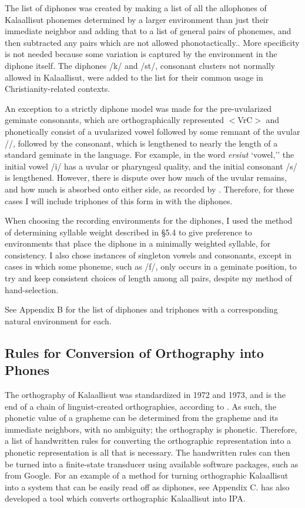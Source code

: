 \documentclass[12pt]{article}
\begin{document}
	The list of diphones was created by making a list of all the allophones of Kalaallisut phonemes determined by a larger environment than just their immediate neighbor and adding that to a list of general pairs of phonemes, and then subtracted any pairs which are not allowed phonotactically.. More specificity is not needed because some variation is captured by the environment in the diphone itself. The diphones /k\textinvscr/ and /st/, consonant clusters not normally allowed in Kalaallisut, were added to the list for their common usage in Christianity-related contexts.\par
	An exception to a strictly diphone model was made for the pre-uvularized geminate consonants, which are orthographically represented $<$VrC$>$ and phonetically consist of a uvularized vowel followed by some remnant of the uvular /\textinvscr/, followed by the consonant, which is lengthened to nearly the length of a standard geminate in the language. For example, in the word \textit{ersiut} `vowel,'' the initial vowel /i/ has a uvular or pharyngeal quality, and the initial consonant /s/ is lengthened. However, there is dispute over how much of the uvular remains, and how much is absorbed onto either side, as recorded by \citet{rischel}. Therefore, for these cases I will include triphones of this form in with the diphones. \par
	When choosing the recording environments for the diphones, I used the method of determining syllable weight described in \S 5.4 to give preference to environments that place the diphone in a minimally weighted syllable, for consistency. I also chose instances of singleton vowels and consonants, except in cases in which some phoneme, such as /f/, only occurs in a geminate position, to try and keep consistent choices of length among all pairs, despite my method of hand-selection. \par
	See Appendix B for the list of diphones and triphones with a corresponding natural environment for each. \par

	\subsection{Rules for Conversion of Orthography into Phones}

	The orthography of Kalaallisut was standardized in 1972 and 1973, and is the end of a chain of linguist-created orthographies, according to \citet{rischel}. As such, the phonetic value of a grapheme can be determined from the grapheme and its immediate neighbors, with no ambiguity; the orthography is phonetic. Therefore, a list of handwritten rules for converting the orthographic representation into a phonetic representation is all that is necessary. The handwritten rules can then be turned into a finite-state transducer using available software packages, such as from Google. For an example of a method for turning orthographic Kalaallisut into a system that can be easily read off as diphones, see Appendix C. \citet{gov} has also developed a tool which converts orthographic Kalaallisut into IPA. \par
\end{document}
